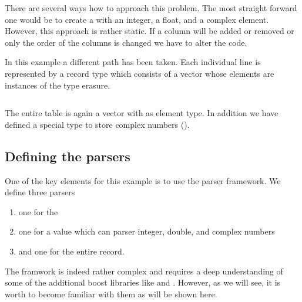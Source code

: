 There are several ways how to approach this problem. The most straight forward
one would be to create a  with an integer, a float, and a complex
element. However, this approach is rather static. If a column will be added or
removed or only the order of the columns is changed we have to alter the code. 

In this example a different path has been taken. Each individual line is
represented by a record type which consists of a vector whose elements are
instances of the  type erasure.   
\inputminted[linenos,
             fontsize=\small,
             firstnumber=26,
             firstline=26,
             lastline=40,
             frame=lines,
             label=examples/type\_erasure\_record.cpp
             ]
{cpp}{../examples/type_erasure_record.cpp}
The entire table is again a vector with  as element type.
In addition we have defined a special type to store complex numbers
().

\subsection{Defining the parsers}

One of the key elements for this example is to use the 
parser framework. We define three parsers
\begin{enumerate}
\item one for the 
\item one for a value which can parser integer, double, and complex numbers
\item and one for the entire record.
\end{enumerate}
The  framwork is indeed rather complex and requires a deep
understanding of some of the additional boost libraries like  and
. However, as we will see, it is worth to become familiar with them
as will be shown here.

